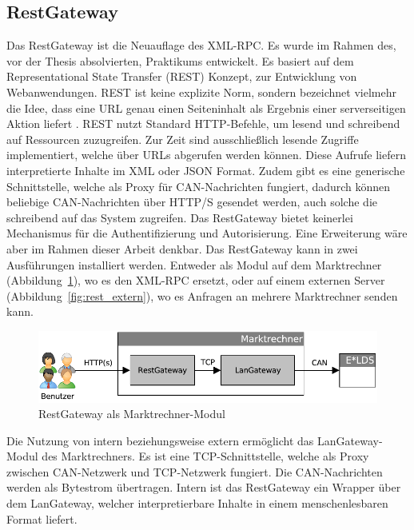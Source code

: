 \documentclass[11pt,a4paper]{report}
\begin{document}
\subsection{RestGateway} 
Das RestGateway ist die Neuauflage des XML-RPC. Es wurde im Rahmen des, vor der Thesis absolvierten, Praktikums entwickelt. Es basiert auf dem Representational State Transfer (REST) Konzept, zur Entwicklung von Webanwendungen. REST ist keine explizite Norm, sondern bezeichnet vielmehr die Idee, dass eine URL genau einen Seiteninhalt als Ergebnis einer serverseitigen Aktion liefert \cite{wiki_rest}. REST nutzt Standard HTTP-Befehle, um lesend und schreibend auf Ressourcen zuzugreifen. Zur Zeit sind ausschließlich lesende Zugriffe implementiert, welche über URLs abgerufen werden können. Diese Aufrufe liefern interpretierte Inhalte im XML oder JSON Format. Zudem gibt es eine generische Schnittstelle, welche als Proxy für CAN-Nachrichten fungiert, dadurch können beliebige CAN-Nachrichten über HTTP/S gesendet werden, auch solche die schreibend auf das System zugreifen. Das RestGateway bietet keinerlei Mechanismus für die Authentifizierung und Autorisierung. Eine Erweiterung wäre aber im Rahmen dieser Arbeit denkbar. Das RestGateway kann in zwei Ausführungen installiert werden. Entweder als Modul auf dem Marktrechner (Abbildung~\ref{fig:rest_intern}), wo es den XML-RPC ersetzt, oder auf einem externen Server (Abbildung~\ref{fig:rest_extern}), wo es Anfragen an mehrere Marktrechner senden kann. 

\begin{figure}[htbp]
\centering
\includegraphics[scale=0.7]{images/RestGateway_intern.pdf}
\caption[]{RestGateway als Marktrechner-Modul}
\label{fig:rest_intern}
\end{figure}

Die Nutzung von intern beziehungsweise extern ermöglicht das LanGateway-Modul des Marktrechners. Es ist eine TCP-Schnittstelle, welche als Proxy zwischen CAN-Netzwerk und TCP-Netzwerk fungiert. Die CAN-Nachrichten werden als Bytestrom übertragen. Intern ist das RestGateway ein Wrapper über dem LanGateway, welcher interpretierbare Inhalte in einem menschenlesbaren Format liefert.
\end{document}
